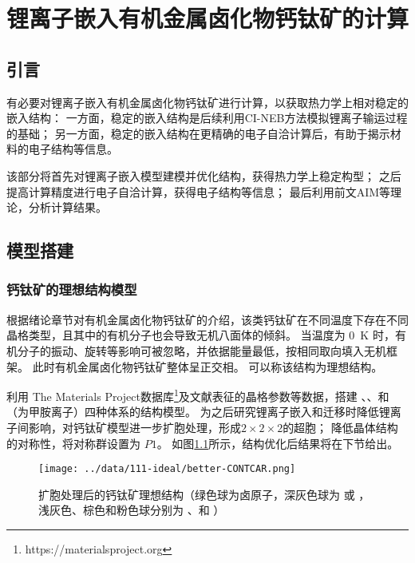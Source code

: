 \chapter{锂离子嵌入有机金属卤化物钙钛矿的计算}

\section{引言}

有必要对锂离子嵌入有机金属卤化物钙钛矿进行计算，以获取热力学上相对稳定的嵌入结构：
一方面，稳定的嵌入结构是后续利用CI-NEB方法模拟锂离子输运过程的基础；
另一方面，稳定的嵌入结构在更精确的电子自洽计算后，有助于揭示材料的电子结构等信息。

该部分将首先对锂离子嵌入模型建模并优化结构，获得热力学上稳定构型；
之后提高计算精度进行电子自洽计算，获得电子结构等信息；
最后利用前文AIM等理论，分析计算结果。

\section{模型搭建}

\subsection{钙钛矿的理想结构模型}

根据绪论章节对有机金属卤化物钙钛矿的介绍，该类钙钛矿在不同温度下存在不同晶格类型，且其中的有机分子也会导致无机八面体的倾斜。
当温度为 \SI{0}{K} 时，有机分子的振动、旋转等影响可被忽略，并依据能量最低，按相同取向填入无机框架。
此时有机金属卤化物钙钛矿整体呈正交相。
可以称该结构为理想结构。

利用 The Materials Project数据库\footnote{https://materialsproject.org}及文献\cite{yinMetalChloridePerovskite2020}表征的晶格参数等数据，搭建 、、和  （为甲胺离子）四种体系的结构模型。
为之后研究锂离子嵌入和迁移时降低锂离子间影响，对钙钛矿模型进一步扩胞处理，形成$2\times2\times2$的超胞；
降低晶体结构的对称性，将对称群设置为 $P1$。
如图\ref{fig:ideal-struc}所示，结构优化后结果将在下节给出。

\begin{figure}[ht]
    \centering
    \texttt{[image: ../data/111-ideal/better-CONTCAR.png]}
    \caption{扩胞处理后的钙钛矿理想结构（绿色球为卤原子，深灰色球为 或 ，浅灰色、棕色和粉色球分别为 、和 ）}
    \label{fig:ideal-struc}
\end{figure}

